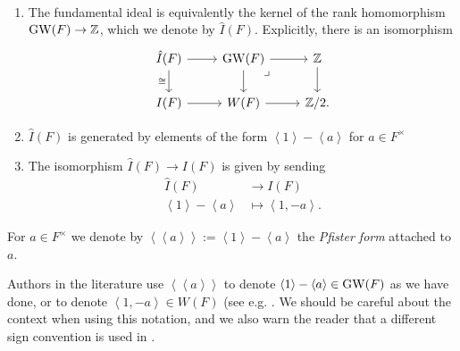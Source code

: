 \documentclass[11pt,openany]{book}
\newcommand{\Pfister}[1]{\left\langle\! \left\langle #1 \right\rangle\! \right\rangle}
\begin{document}
\begin{proposition} $\ $
\begin{enumerate}
    \item The fundamental ideal is equivalently the kernel of the rank homomorphism $\mathrm{GW}(F) \to \mathbb{Z}$, which we denote by $\hat{I}(F)$. Explicitly, there is an isomorphism
\[ \begin{tikzcd}
    \hat{I}(F)\rar\dar["\cong" left] & \GW(F)\rar\dar\pb & \Z\dar\\
    I(F) \rar & W(F)\rar & \Z/2.
\end{tikzcd} \]

\item $\hat{I}(F)$ is generated by elements of the form $\left\langle 1 \right\rangle - \left\langle a \right\rangle$ for $a\in F^\times$

\item The isomorphism $\hat{I}(F) \to I(F)$ is given by sending
\begin{align*}
    \hat{I}(F) &\to I(F) \\
    \left\langle 1 \right\rangle - \left\langle a \right\rangle &\mapsto \left\langle 1,-a \right\rangle.
\end{align*}
\end{enumerate}
\end{proposition}

\begin{definition} For $a \in F^\times$ we denote by $\Pfister{a}:= \left\langle 1 \right\rangle - \left\langle a \right\rangle$ the \textit{Pfister form} attached to $a$.
\end{definition}

\begin{remark}[On notation] Authors in the literature use $\Pfister{a}$ to denote $\left\langle 1 \right\rangle - \left\langle a \right\rangle \in \mathrm{GW}(F)$ as we have done, or to denote $\left\langle 1,-a \right\rangle\in W(F)$ (see e.g. \cite[p.~24]{EKM}. We should be careful about the context when using this notation, and we also warn the reader that a different sign convention is used in \cite[X.1.1]{Lam-quad}.
\end{remark}
\end{document}
